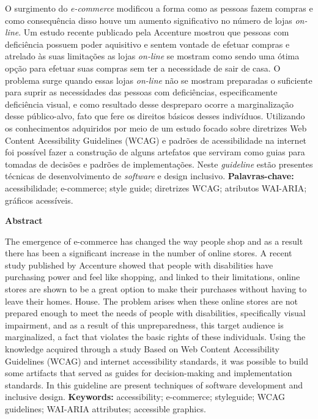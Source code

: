 
{O surgimento do \textit{e-commerce} modificou a forma como as pessoas fazem compras e como consequência disso houve um aumento significativo no número de lojas \textit{on-line}. Um estudo recente publicado pela Accenture mostrou que pessoas com deficiência possuem poder aquisitivo e sentem vontade de efetuar compras e atrelado às suas limitações as lojas \textit{on-line} se mostram como sendo uma ótima opção para efetuar suas compras sem ter a necessidade de sair de casa. O problema surge quando essas lojas \textit{on-line} não se mostram preparadas o suficiente para suprir as necessidades das pessoas com deficiências, especificamente deficiência visual, e como resultado desse despreparo ocorre a marginalização desse público-alvo, fato que fere os direitos básicos desses indivíduos. Utilizando os conhecimentos adquiridos por meio de um estudo focado sobre diretrizes Web Content Acessibility Guidelines (WCAG) e padrões de acessibilidade na internet foi possível fazer a construção de alguns artefatos que serviram como guias para tomadas de decisões e padrões de implementações. Neste \textit{guideline} estão presentes técnicas de desenvolvimento de \textit{software} e design inclusivo.
\vspace{1,5cm}
\newline
\textbf{Palavras-chave:} acessibilidade; e-commerce; style guide; diretrizes WCAG; atributos WAI-ARIA; gráficos acessíveis.
} 



\vspace{60px}
{

\centerline{\textbf{Abstract}}
\vspace{10px}
The emergence of e-commerce has changed the way people shop and as a result there has been a significant increase in the number of online stores. A recent study published by Accenture showed that people with disabilities have purchasing power and feel like shopping, and linked to their limitations, online stores are shown to be a great option to make their purchases without having to leave their homes. House. The problem arises when these online stores are not prepared enough to meet the needs of people with disabilities, specifically visual impairment, and as a result of this unpreparedness, this target audience is marginalized, a fact that violates the basic rights of these individuals. Using the knowledge acquired through a study
Based on Web Content Accessibility Guidelines (WCAG) and internet accessibility standards, it was possible to build some artifacts that served as guides for decision-making and implementation standards. In this guideline are present techniques of software development and inclusive design.
\vspace{1,5cm}
\newline
\textbf{Keywords:} accessibility; e-commerce; styleguide; WCAG guidelines; WAI-ARIA attributes; accessible graphics.

}